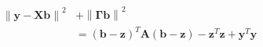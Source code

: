 \documentclass[10pt]{article}
\begin{document}
\begin{align*}\begin{split}
\left\lVert \boldsymbol y - \boldsymbol{X} \boldsymbol{b} \right \rVert^2 &+ \left\lVert \boldsymbol{\Gamma} \boldsymbol{b} \right \rVert^2 \\
&= 
\left( \boldsymbol b - \boldsymbol z \right)^T \boldsymbol A \left( \boldsymbol b - \boldsymbol z \right) -
\boldsymbol z^T \boldsymbol z + \boldsymbol y^T \boldsymbol y \\
\end{split}\end{align*}
\end{document}

